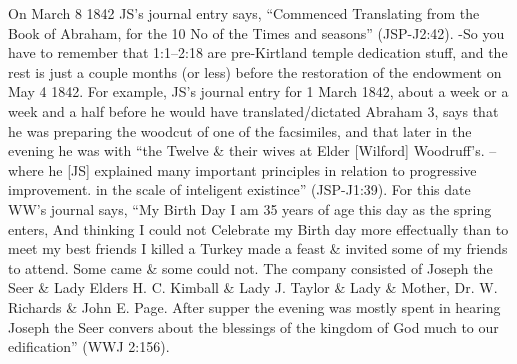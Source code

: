 \begin{compactitem}
			On March 8 1842 JS's journal entry says, ``Commenced Translating from the Book of Abraham, for the 10 No of the Times and seasons'' (JSP-J2:42).
		-So you have to remember that 1:1--2:18 are pre-Kirtland temple dedication stuff, and the rest is just a couple months (or less) before the restoration of the endowment on May 4 1842.
			For example, JS's journal entry for 1 March 1842, about a week or a week and a half before he would have translated/dictated Abraham 3, says that he was preparing the woodcut of one of the facsimiles, and that later in the evening he was with ``the Twelve \& their wives at Elder [Wilford] Woodruff's. --where he [JS] explained many important principles in relation to progressive improvement. in the scale of inteligent existince'' (JSP-J1:39).
				For this date WW's journal says, ``My Birth Day I am 35 years of age this day as the spring enters, And thinking I could not Celebrate my Birth day more effectually than to meet my best friends I killed a Turkey made a feast \& invited some of my friends to attend. Some came \& some could not. The company consisted of Joseph the Seer \& Lady Elders H. C. Kimball \& Lady J. Taylor \& Lady \& Mother, Dr. W. Richards \& John E. Page. After supper the evening was mostly spent in hearing Joseph the Seer convers about the blessings of the kingdom of God much to our edification'' (WWJ 2:156).
		

\end{compactitem}
